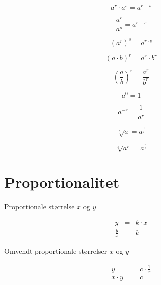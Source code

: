 \documentclass[11pt,a4paper,landscape,twocolumn,fleqn,leqno]{article}
\begin{document}
\begin{equation}
a^{r} \cdot a^{s} = a^{r+s}
\end{equation}

\begin{equation}
\dfrac{a^{r}}{a^{s}} = a^{r-s}
\end{equation}

\begin{equation}
\left(a^{r}\right)^{s} = a^{r \cdot s}
\end{equation}

\begin{equation}
\left(a \cdot b\right)^{r} = a^{r} \cdot b^{r}
\end{equation}

\begin{equation}
\left(\dfrac{a}{b}\right)^{r} = \dfrac{a^{r}}{b^{r}}
\end{equation}

\begin{equation}
a^{0} = 1
\end{equation}

\begin{equation}
a^{-r} = \dfrac{1}{a^{r}}
\end{equation}

\begin{equation}
\sqrt[r]{a} = a^{\frac{1}{r}}
\end{equation}

\begin{equation}
\sqrt[s]{a^{r}} = a^{\frac{r}{s}}
\end{equation}

\section{Proportionalitet}

Proportionale størrelse $x$ og $y$

\begin{eqnarray}
y & =&  k \cdot x \\
\frac{y}{x} & = & k \nonumber
\end{eqnarray}

Omvendt proportionale størrelser $x$ og $y$

\begin{eqnarray}
y & = & c \cdot \frac{1}{x} \\
x \cdot y & = & c \nonumber
\end{eqnarray}

\vfill
\end{document}
